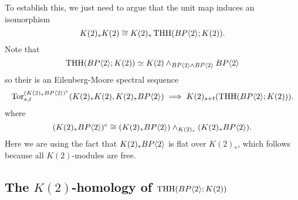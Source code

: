 To establish this, we just need to argue that the unit map induces an isomorphism
\[
K(2)_*K(2) \cong K(2)_*\operatorname{THH}(BP\langle 2 \rangle;K(2)).
\]
Note that 
\[ \operatorname{THH}(BP\langle 2 \rangle;K(2))\simeq K(2) \wedge_{BP\langle 2 \rangle\wedge BP\langle 2 \rangle}BP\langle 2 \rangle \]
so their is an Eilenberg-Moore spectral sequence 
\begin{equation}\label{EMss}
\operatorname{Tor}^{(K(2)_*BP\langle 2 \rangle)^e}_{s,t}(K(2)_*K(2), K(2)_*BP\langle 2 \rangle)\implies K(2)_{s+t}(\operatorname{THH}(BP\langle 2 \rangle;K(2))).
\end{equation}
where 
\[(K(2)_*BP\langle 2 \rangle)^e\cong (K(2)_*BP\langle 2 \rangle)\wedge_{K(2)_*}  (K(2)_*BP\langle 2 \rangle).\]
Here we are using the fact that $K(2)_*BP\langle 2 \rangle$ is flat over $K(2)_*$, which follows because all $K(2)$-modules are free. 
\begin{comment}
First, recall that the Morava $K$-theories possess a K\"unneth isomorphism, which gives us a B\"okstedt spectral sequence 
\begin{equation}\label{eqn:K(2)Bokstedt}
\HH_*^{K(2)_*}(K(2)_*\B)\implies K(2)_*\THH(\B).
\end{equation}
We will analyze this spectral sequence below to show that $K(2)_*\THH(\B)$ is isomorphic to $K(2)_*\B$. This part of our analysis is a modification of the calculation of $K(1)_*\THH(\ell)$ found in \cite{McClureStaffeldt}. There is also a weak equivalence of spectra
\[
\THH(\B;K(2))\simeq K(2)\wedge_{\B}\THH(\B).
\]
To compute the $K(2)$-homology of this spectrum, we apply a Eilenberg-Moore spectral sequence (cf. \cite[IV, 6.4]{EKMM}), which takes the form 
\[
\Tor^{K(2)_*\B}_{s,t}(K(2)_*K(2), K(2)_*\THH(\B))\implies K(2)_{s+t}(\THH(\B;K(2))).
\]
Once we prove the isomorphism $K(2)_*\THH(\B)\cong K(2)_*\B$, the $E_2$-term is concentrated in $s=0$, resulting in the collapsing of this spectral sequence. This will show that 
\[
K(2)_*\THH(\B;K(2))\cong K(2)_*K(2)
\]
from which we can conclude that every class except those in $P(v_2)\subset \THH(\B;k(2))$ is $v_2$-torsion. From this we will deduce the differentials in the $v_2$-Bockstein spectral sequence. 
\end{comment}
 
\subsection{The $K(2)$-homology of $\operatorname{THH}(BP\langle 2 \rangle;K(2))$}

